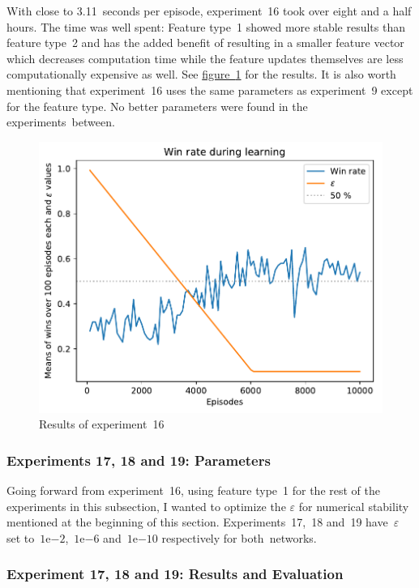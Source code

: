 \documentclass[a4paper,titlepage]{article}
\newcommand{\expn}[2]{{#1}\mathrm{e}{#2}}
\begin{document}
With close to 3.11~seconds per episode, experiment~16 took over eight and a half hours. The time was well spent: Feature type~1 showed more stable results than feature type~2 and has the added benefit of resulting in a smaller feature vector which decreases computation time while the feature updates themselves are less computationally expensive as well. See \hyperref[fig:exp16]{figure~\ref*{fig:exp16}} for the results. It is also worth mentioning that experiment~16 uses the same parameters as experiment~9 except for the feature type. No better parameters were found in the experiments~between.
\begin{figure}
  \centering
  \includegraphics[width=\textwidth]{../experiments/exp16/win_stats.pdf}
  \caption{Results of experiment~16}
  \label{fig:exp16}
\end{figure}

\subsubsection*{Experiments 17, 18 and 19: Parameters}

Going forward from experiment~16, using feature type~1 for the rest of the experiments in this subsection, I wanted to optimize the $\varepsilon$ for numerical stability mentioned at the beginning of this section. Experiments~17,~18 and~19 have~$\varepsilon$ set to~$\expn{1}{-2}$,~$\expn{1}{-6}$ and~$\expn{1}{-10}$ respectively for both~networks.

\subsubsection*{Experiment 17, 18 and 19: Results and Evaluation}
\end{document}

